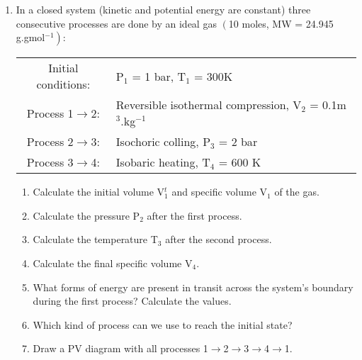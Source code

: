 \documentclass[12pts,a4paper,amsmath,amssymb,floatfix]{article}%
\begin{document}
\begin{enumerate}[label=\bfseries Problem \arabic*:]
\begin{comment}
\item\label{Tut02:CylinderPiston1}A gas is confined in a vertical 0.47 m diameter cylinder by a piston. On the piston rests a weight and the combined mass of the piston and weight is 150 kg. The local acceleration of gravity is 9.81 m.s$^{-2}$ and the ambient pressure is 101.57 kPa.
\begin{enumerate}
\item What is the total force exerted on the gas by the atmosphere, the piston and the weight assuming no friction between the piston and the cylinder?
\item What is the pressure of the gas? 
\item The gas in the cylinder is heated and expands pushing the piston and weight upward. Calculate the work done by the gas if the piston and weight are raised 0.83 m. What is the change in potential energy of the piston and weight?
\end{enumerate}
\end{comment}
\item\label{Tut02:IdealGas1}In a closed system (kinetic and potential energy are constant) three consecutive processes are done by an ideal gas $\left(\right.$10 moles, MW = 24.945 g.gmol$\left.^{-1}\right)$:
\begin{center}
\begin{tabular}{c l}
\hline
Initial conditions: & P$_{1}$ = 1 bar, T$_{1}$ = 300K \\
Process 1$\rightarrow$2: & Reversible isothermal compression, V$_{2}$ = 0.1m$^{3}$.kg$^{-1}$ \\
Process 2$\rightarrow$3: & Isochoric colling, P$_{3}$ = 2 bar \\
Process 3$\rightarrow$4: & Isobaric heating, T$_{4}$ = 600 K \\
\hline
\end{tabular}
\end{center}
\begin{enumerate}
\item Calculate the initial volume V$^{t}_{1}$ and specific volume V$_{1}$ of the gas.%
\item Calculate the pressure P$_{2}$ after the first process. %
\item Calculate the temperature T$_{3}$ after the second process.%
\item Calculate the final specific volume V$_{4}$. %
\item What forms of energy are present in transit across the system's boundary during the first process? Calculate the values. %
\item Which kind of process can we use to reach the initial state?
\item Draw a PV diagram with all processes 1$\rightarrow$2$\rightarrow$3$\rightarrow$4$\rightarrow$1.
\end{enumerate}



\end{enumerate}
\end{document}
